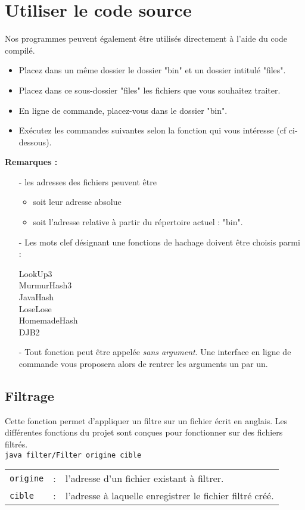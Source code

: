\documentclass[12pt,a4paper,titlepage]{article}
\newcommand{\code}[1]{ \texttt{\footnotesize #1} }
\begin{document}
\section{Utiliser le code source}
Nos programmes peuvent également être utilisés directement à l'aide du code compilé.
\begin{itemize}
\item Placez dans un même dossier le dossier "bin" et un dossier intitulé "files".
\item Placez dans ce sous-dossier "files" les fichiers que vous souhaitez traiter.
\item En ligne de commande, placez-vous dans le dossier "bin".
\item Exécutez les commandes suivantes selon la fonction qui vous intéresse (cf ci-dessous).
\end{itemize}

\textbf{Remarques :}
\begin{itemize}
\item[-] les adresses des fichiers peuvent être
	\begin{itemize}
	\item soit leur adresse absolue
	\item soit l'adresse relative à partir du répertoire actuel : "bin".
	\end{itemize}
\item[-] Les mots clef désignant une fonctions de hachage doivent être choisis parmi :
	\begin{center}
	LookUp3 \\
	MurmurHash3 \\
	JavaHash \\
	LoseLose \\
	HomemadeHash \\
	DJB2
	\end{center}
\item[-] Tout fonction peut être appelée \emph{sans argument}. Une interface en ligne de commande vous proposera alors de rentrer les arguments un par un.
\end{itemize}



\subsection{Filtrage}
Cette fonction permet d'appliquer un filtre sur un fichier écrit en anglais. Les différentes fonctions du projet sont conçues pour fonctionner sur des fichiers filtrés.\\
\indent\indent\code{java filter/Filter origine cible}\\
\begin{tabular}{lcl}
\code{origine} &:& l'adresse d'un fichier existant à filtrer.\\
\code{cible} &:& l'adresse à laquelle enregistrer le fichier filtré créé.
\end{tabular}\\
\end{document}
